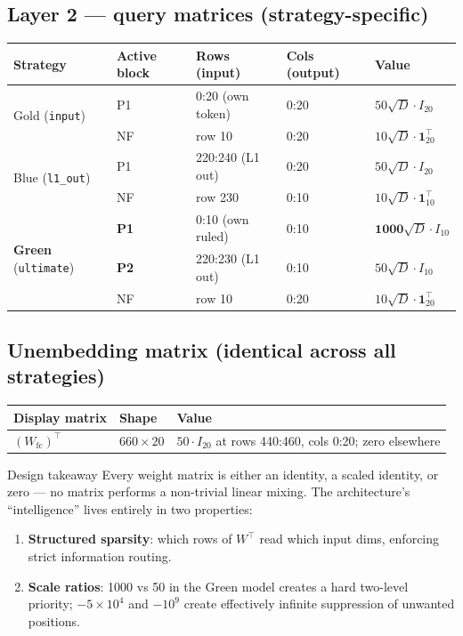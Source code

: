 \documentclass[11pt]{article}
\begin{document}
\subsection{Layer 2 --- query matrices (strategy-specific)}

\begin{center}
\begin{tabular}{lllll}
\toprule
\textbf{Strategy} & \textbf{Active block} & \textbf{Rows (input)} & \textbf{Cols (output)} & \textbf{Value}\\
\midrule
\multirow{2}{*}{Gold (\texttt{input})}
  & P1 & 0:20 (own token) & 0:20 & $50\sqrt{D}\cdot I_{20}$\\
  & NF & row 10           & 0:20 & $10\sqrt{D}\cdot\mathbf{1}_{20}^\top$\\
\midrule
\multirow{2}{*}{Blue (\texttt{l1\_out})}
  & P1 & 220:240 (L1 out) & 0:20 & $50\sqrt{D}\cdot I_{20}$\\
  & NF & row 230          & 0:10 & $10\sqrt{D}\cdot\mathbf{1}_{10}^\top$\\
\midrule
\multirow{3}{*}{\textbf{Green} (\texttt{ultimate})}
  & \textbf{P1} & 0:10 (own ruled)  & 0:10 & $\mathbf{1000}\sqrt{D}\cdot I_{10}$\\
  & \textbf{P2} & 220:230 (L1 out)  & 0:10 & $50\sqrt{D}\cdot I_{10}$\\
  & NF          & row 10            & 0:20 & $10\sqrt{D}\cdot\mathbf{1}_{20}^\top$\\
\bottomrule
\end{tabular}
\end{center}

\subsection{Unembedding matrix (identical across all strategies)}

\begin{center}
\begin{tabular}{lll}
\toprule
\textbf{Display matrix} & \textbf{Shape} & \textbf{Value}\\
\midrule
$(W_{\mathrm{fc}})^\top$ & $660\times20$
  & $50\cdot I_{20}$ at rows 440:460, cols 0:20; zero elsewhere\\
\bottomrule
\end{tabular}
\end{center}

\begin{warningbox}{Design takeaway}
Every weight matrix is either an identity, a scaled identity, or zero --- no matrix performs a
non-trivial linear mixing. The architecture's ``intelligence'' lives entirely in two properties:
\begin{enumerate}
  \item \textbf{Structured sparsity}: which rows of $W^\top$ read which input dims, enforcing strict
        information routing.
  \item \textbf{Scale ratios}: 1000 vs 50 in the Green model creates a hard two-level priority;
        $-5\times10^4$ and $-10^9$ create effectively infinite suppression of unwanted positions.
\end{enumerate}
\end{warningbox}
\end{document}

